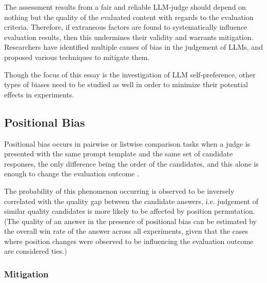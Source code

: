 \documentclass[noindent,nohyp,parspace,titlepage,twoside,12pt]{article}
\begin{document}
    The assessment results from a fair and reliable LLM-judge should depend on
    nothing but the quality of the evaluated content with regards to the
    evaluation criteria. Therefore, if extraneous factors are found to
    systematically influence evaluation results, then this undermines their
    validity and warrants mitigation. Researchers have identified multiple
    causes of bias in the judgement of LLMs, and proposed various techniques
    to mitigate them.

    Though the focus of this essay is the investigation of LLM self-preference,
    other types of biases need to be studied as well in order to minimize their
    potential effects in experiments.

    \subsection{Positional Bias}

      Positional bias occurs in pairwise or listwise comparison tasks when a
      judge is presented with the same prompt template and the same set of
      candidate responses, the only difference being the order of the candidates,
      and this alone is enough to change the evaluation outcome
      \cite{biaspos,notfair}.

      The probability of this phenomenon occurring is observed to be inversely
      correlated with the quality gap between the candidate answers, i.e.
      judgement of similar quality candidates is more likely to be affected by
      position permutation. (The quality of an answer in the presence of
      positional bias can be estimated by the overall win rate of the answer
      across all experiments, given that the cases where position changes
      were observed to be influencing the evaluation outcome are considered
      ties.)

      \subsubsection{Mitigation}
\end{document}
